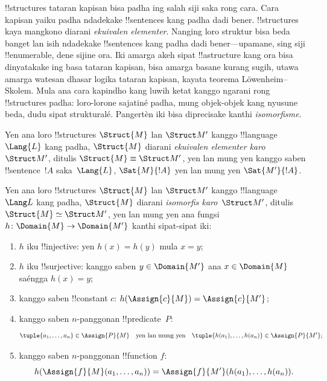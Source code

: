 \documentclass[../../../include/open-logic-section]{subfiles}
\begin{document}

!!{structure}s tataran kapisan bisa padha
ing salah siji saka rong cara.
Cara kapisan yaiku padha ndadekake
!!{sentence}s kang padha dadi bener.
!!{structure}s kaya mangkono
diarani \emph{ekuivalen elementer}.
Nanging loro struktur bisa beda
banget lan isih ndadekake
!!{sentence}s kang padha
dadi bener---upamane, sing siji
!!{enumerable}, dene
sijine ora. Iki amarga akeh
sipat !!a{structure} kang
ora bisa dinyatakake ing
basa tataran kapisan, bisa
amarga basane kurang sugih,
utawa amarga watesan
dhasar logika tataran kapisan,
kayata teorema
L\"owenheim--Skolem.
Mula ana cara kapindho
kang luwih ketat kanggo
ngarani rong !!{structure}s
padha: loro-lorone
sajatiné padha, mung
objek-objek kang nyusune
beda, dudu sipat
strukturalé. Pangertèn
iki bisa diprecisake
kanthi \emph{isomorfisme}.

\begin{defn}
Yen ana loro !!{structure}s
$\Struct{M}$ lan $\Struct M'$
kanggo !!{language}~$\Lang{L}$
kang padha, $\Struct{M}$
diarani \emph{ekuivalen elementer
  karo} $\Struct M'$,
ditulis $\Struct{M} \equiv \Struct M'$,
yen lan mung yen kanggo
saben !!{sentence}~$!A$
saka~$\Lang{L}$,
$\Sat{M}{!A}$ yen lan
mung yen $\Sat{M'}{!A}$.
\end{defn}

\begin{defn}
Yen ana loro !!{structure}s
$\Struct{M}$ lan
$\Struct M'$ kanggo
!!{language}~$\Lang L$
kang padha, $\Struct{M}$
diarani \emph{isomorfis
karo}~$\Struct M'$,
ditulis $\Struct{M}
\simeq \Struct M'$,
yen lan mung yen ana
fungsi $h \colon
\Domain{M} \to \Domain{M'}$
kanthi sipat-sipat iki:
\begin{enumerate}
\item $h$ iku !!{injective}:
  yen $h(x) = h(y)$
  mula $x = y$;
\item $h$ iku !!{surjective}:
  kanggo saben $y \in \Domain{M'}$
  ana $x \in \Domain{M}$
  saéngga $h(x) = y$;
\item {}kanggo saben
  !!{constant} $c$:
  $h(\Assign{c}{M}) = \Assign{c}{M'}$;
\item {}kanggo saben
  $n$-panggonan !!{predicate}~$P$:
  \[
  \tuple{a_1, \dots, a_n}\in \Assign{P}{M} \quad\text{yen lan mung yen}\quad
  \tuple{h(a_1), \dots, h(a_n)} \in \Assign{P}{M'};
  \]
\item {}kanggo saben
  $n$-panggonan !!{function} $f$:
  \[
  h(\Assign{f}{M}(a_1, \dots, a_n)) =
  \Assign{f}{M'}(h(a_1), \dots, h(a_n)).
  \]
\end{enumerate}
\end{defn}
\end{document}
